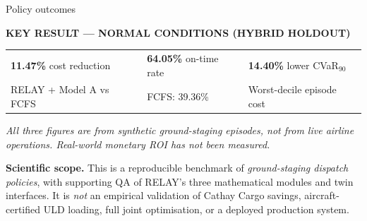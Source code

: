 \documentclass[10pt,a4paper]{article}
\newcommand{\methodnote}[1]{{\footnotesize\color{muted}\textit{#1}}\par}
\newcommand{\good}[1]{{\bfseries\color{teal}#1}}
\begin{document}
\begin{minipage}[t]{0.245\linewidth}
\begin{tcolorbox}[colback=white,colframe=line,arc=2mm,boxrule=.4pt,height=29mm]
{\footnotesize\color{muted} Policy outcomes}\par\vspace{2mm}{\LARGE\bfseries 15,000}\par\vspace{1mm}{\scriptsize 500 per regime and policy}
\end{tcolorbox}
\end{minipage}
\vspace{5mm}
\begin{insight}
{\sffamily\bfseries KEY RESULT --- NORMAL CONDITIONS (HYBRID HOLDOUT)}\par
\vspace{3mm}
\begin{tabularx}{\linewidth}{@{}XXX@{}}
\good{11.47\%} cost reduction & \good{64.05\%} on-time rate & \good{14.40\%} lower CVaR$_{90}$\\
RELAY + Model A vs FCFS & FCFS: 39.36\% & Worst-decile episode cost
\end{tabularx}
\vspace{2mm}
\methodnote{All three figures are from synthetic ground-staging episodes, not from live airline operations. Real-world monetary ROI has not been measured.}
\end{insight}
\vspace{3mm}
\begin{caution}
\textbf{Scientific scope.} This is a reproducible benchmark of \emph{ground-staging dispatch policies}, with supporting QA of RELAY's three mathematical modules and twin interfaces. It is \emph{not} an empirical validation of Cathay Cargo savings, aircraft-certified ULD loading, full joint optimisation, or a deployed production system.
\end{caution}
\newpage
\end{document}
